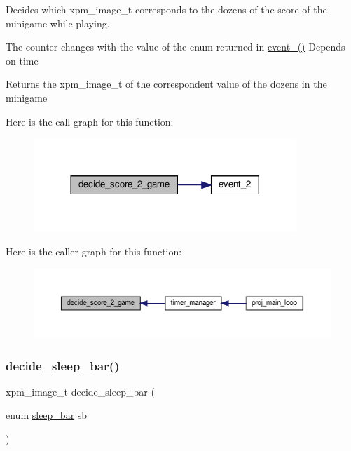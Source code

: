 Decides which xpm\+\_\+image\+\_\+t corresponds to the dozens of the score of the minigame while playing. 

The counter changes with the value of the enum returned in \hyperlink{group__loading__xpms_gac00aab23f7677ce5eee5748c335c994f}{event\+\_()} Depends on time

\begin{DoxyReturn}{Returns}
the xpm\+\_\+image\+\_\+t of the correspondent value of the dozens in the minigame 
\end{DoxyReturn}
Here is the call graph for this function\+:
\nopagebreak
\begin{figure}[H]
\begin{center}
\leavevmode
\includegraphics[width=281pt]{group__loading__xpms_ga2427af4195752a8d1c1f52ec6ade7735_cgraph}
\end{center}
\end{figure}
Here is the caller graph for this function\+:
\nopagebreak
\begin{figure}[H]
\begin{center}
\leavevmode
\includegraphics[width=350pt]{group__loading__xpms_ga2427af4195752a8d1c1f52ec6ade7735_icgraph}
\end{center}
\end{figure}
\mbox{\label{group__loading__xpms_gafe3e8d1842749e3b8831f03eaff01c99}} 
\subsubsection{\texorpdfstring{decide\+\_\+sleep\+\_\+bar()}{decide\_sleep\_bar()}}
{\footnotesize\ttfamily xpm\+\_\+image\+\_\+t decide\+\_\+sleep\+\_\+bar (\begin{DoxyParamCaption}\item[{enum \hyperlink{group__types_ga210774229705ea136db591a108c52d39}{sleep\+\_\+bar}}]{sb }\end{DoxyParamCaption})}



